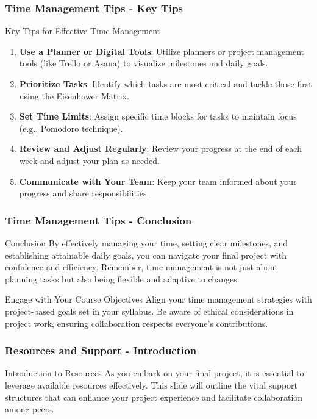 \documentclass[aspectratio=169]{beamer}
\begin{document}
\begin{frame}[fragile]
    \frametitle{Time Management Tips - Key Tips}
    \begin{block}{Key Tips for Effective Time Management}
        \begin{enumerate}
            \item \textbf{Use a Planner or Digital Tools}: Utilize planners or project management tools (like Trello or Asana) to visualize milestones and daily goals.
            \item \textbf{Prioritize Tasks}: Identify which tasks are most critical and tackle those first using the Eisenhower Matrix.
            \item \textbf{Set Time Limits}: Assign specific time blocks for tasks to maintain focus (e.g., Pomodoro technique).
            \item \textbf{Review and Adjust Regularly}: Review your progress at the end of each week and adjust your plan as needed.
            \item \textbf{Communicate with Your Team}: Keep your team informed about your progress and share responsibilities.
        \end{enumerate}
    \end{block}
\end{frame}

\begin{frame}[fragile]
    \frametitle{Time Management Tips - Conclusion}
    \begin{block}{Conclusion}
        By effectively managing your time, setting clear milestones, and establishing attainable daily goals, you can navigate your final project with confidence and efficiency. Remember, time management is not just about planning tasks but also being flexible and adaptive to changes.
    \end{block}
    \begin{block}{Engage with Your Course Objectives}
        Align your time management strategies with project-based goals set in your syllabus. Be aware of ethical considerations in project work, ensuring collaboration respects everyone's contributions.
    \end{block}
\end{frame}

\begin{frame}[fragile]
    \frametitle{Resources and Support - Introduction}
    \begin{block}{Introduction to Resources}
        As you embark on your final project, it is essential to leverage available resources effectively. This slide will outline the vital support structures that can enhance your project experience and facilitate collaboration among peers.
    \end{block}
\end{frame}
\end{document}
